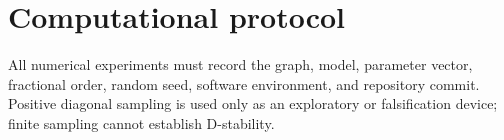 \section{Computational protocol}
All numerical experiments must record the graph, model, parameter vector, fractional order, random seed, software environment, and repository commit. Positive diagonal sampling is used only as an exploratory or falsification device; finite sampling cannot establish D-stability.
